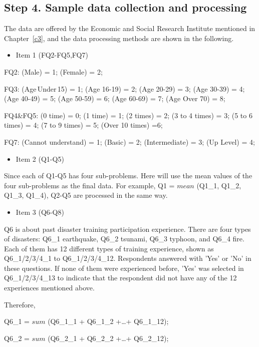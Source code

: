 \subsection{Step 4. Sample data collection and processing}
The data are offered by the Economic and Social Research Institute mentioned in Chapter~\ref{c3}, and the data processing methods are shown in the following. 

\begin{itemize}
\item Item 1 (FQ2-FQ5,FQ7)
\end{itemize}

FQ2: (Male) = 1; (Female) = 2;

FQ3: (Age\,Under\,15) = 1; (Age 16-19) = 2; (Age 20-29) = 3; (Age 30-39) = 4; (Age 40-49) = 5; (Age 50-59) = 6; (Age 60-69) = 7; (Age Over 70) = 8;

FQ4\&FQ5: (0 time) = 0; (1 time) = 1; (2 times) = 2; (3 to 4 times) = 3; (5 to 6 times) = 4; (7 to 9 times) = 5; (Over 10 times) =6;


FQ7: (Cannot understand) = 1; (Basic) = 2; (Intermediate) = 3; (Up Level) = 4; 

\begin{itemize}
\item Item 2 (Q1-Q5)
\end{itemize}

Since each of Q1-Q5 has four sub-problems. Here will use the mean values of the four sub-problems as the final data. For example, Q1 = $mean$ (Q1\_1, Q1\_2, Q1\_3, Q1\_4), Q2-Q5 are processed in the same way.

\begin{itemize}
\item Item 3 (Q6-Q8)
\end{itemize}

Q6 is about past disaster training participation experience. There are four types of disasters: Q6\_1 earthquake, Q6\_2 tsunami, Q6\_3 typhoon, and Q6\_4 fire. Each of them has 12 different types of training experience, shown as Q6\_1/2/3/4\_1 to Q6\_1/2/3/4\_12. Respondents answered with 'Yes' or 'No' in these questions. If none of them were experienced before, 'Yes' was selected in Q6\_1/2/3/4\_13 to indicate that the respondent did not have any of the 12 experiences mentioned above. 

Therefore, 

Q6\_1 = $sum$ (Q6\_1\_1 + Q6\_1\_2 +\dots+ Q6\_1\_12);

Q6\_2 = $sum$ (Q6\_2\_1 + Q6\_2\_2 +\dots+ Q6\_2\_12);

